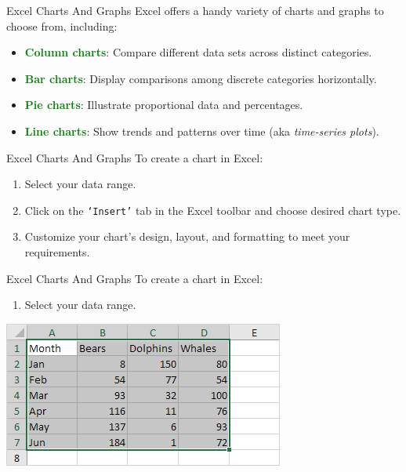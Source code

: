 \documentclass[
  10pt,
  ignorenonframetext,
]{beamer}
\providecommand{\tightlist}{%
  \setlength{\itemsep}{0pt}\setlength{\parskip}{0pt}}
\begin{document}
\begin{frame}{Excel Charts And Graphs}
\protect\hypertarget{excel-charts-and-graphs}{}
Excel offers a handy variety of charts and graphs to choose from,
including:

\begin{itemize}
\item
  \textcolor{green}{\textbf{Column charts}}: Compare different data sets
  across distinct categories.
\item
  \textcolor{green}{\textbf{Bar charts}}: Display comparisons among
  discrete categories horizontally.
\item
  \textcolor{green}{\textbf{Pie charts}}: Illustrate proportional data
  and percentages.
\item
  \textcolor{green}{\textbf{Line charts}}: Show trends and patterns over
  time (aka \emph{time-series plots}).
\end{itemize}
\end{frame}

\begin{frame}[fragile]{Excel Charts And Graphs}
\protect\hypertarget{excel-charts-and-graphs-1}{}
To create a chart in Excel:

\begin{enumerate}
\tightlist
\item
  Select your data range.
\item
  Click on the \texttt{‘Insert’} tab in the Excel toolbar and choose
  desired chart type.
\item
  Customize your chart's design, layout, and formatting to meet your
  requirements.
\end{enumerate}
\end{frame}

\begin{frame}{Excel Charts And Graphs}
\protect\hypertarget{excel-charts-and-graphs-2}{}
To create a chart in Excel:

\begin{enumerate}
\tightlist
\item
  Select your data range.
\end{enumerate}

\begin{center}\includegraphics[width=0.6\linewidth]{pictures/Chart-SelectRange} \end{center}
\end{frame}
\end{document}
